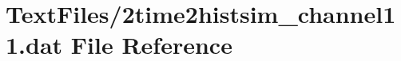 \hypertarget{2time2histsim__channel11_8dat}{}\section{Text\+Files/2time2histsim\+\_\+channel11.dat File Reference}
\label{2time2histsim__channel11_8dat}
